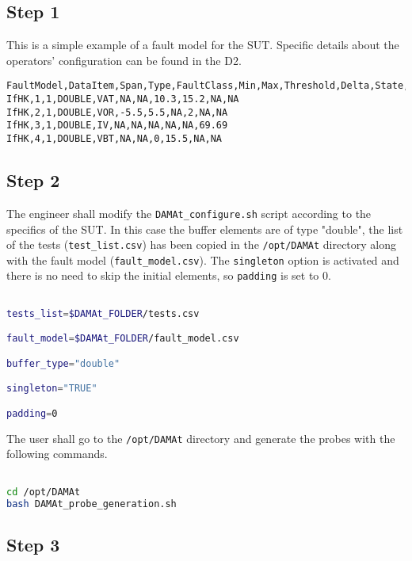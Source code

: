 \subsection{Step 1}

This is a simple example of a fault model for the SUT.
Specific details about the operators' configuration can be found in the D2.

\begin{lstlisting}
FaultModel,DataItem,Span,Type,FaultClass,Min,Max,Threshold,Delta,State,Value
IfHK,1,1,DOUBLE,VAT,NA,NA,10.3,15.2,NA,NA
IfHK,2,1,DOUBLE,VOR,-5.5,5.5,NA,2,NA,NA
IfHK,3,1,DOUBLE,IV,NA,NA,NA,NA,NA,69.69
IfHK,4,1,DOUBLE,VBT,NA,NA,0,15.5,NA,NA
\end{lstlisting}


\subsection{Step 2}

The engineer shall modify the \texttt{DAMAt\_configure.sh} script according to the specifics of the SUT.
In this case the buffer elements are of type "double", the list of the tests (\texttt{test\_list.csv}) has been copied in the \texttt{/opt/DAMAt} directory along with the fault model (\texttt{fault\_model.csv}).
The \texttt{singleton} option is activated and there is no need to skip the initial elements, so \texttt{padding} is set to 0.

\begin{lstlisting}[language=bash]

tests_list=$DAMAt_FOLDER/tests.csv

fault_model=$DAMAt_FOLDER/fault_model.csv

buffer_type="double"

singleton="TRUE"

padding=0

\end{lstlisting}

The user shall go to the \texttt{/opt/DAMAt} directory and generate the probes with the following commands.

\begin{lstlisting}[language=bash]

cd /opt/DAMAt
bash DAMAt_probe_generation.sh

\end{lstlisting}


\subsection{Step 3}

